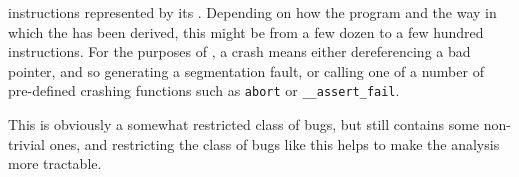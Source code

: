 \begin{itemize}
  instructions represented by its \StateMachine.  Depending on how the
  program and the way in which the \StateMachine has been derived,
  this might be from a few dozen to a few hundred instructions.  For
  the purposes of \implementation, a crash means either dereferencing
  a bad pointer, and so generating a segmentation fault, or calling
  one of a number of pre-defined crashing functions such as
  \verb|abort| or \verb|__assert_fail|.
\end{itemize}

This is obviously a somewhat restricted class of bugs, but still
contains some non-trivial ones, and restricting the class of bugs like
this helps to make the analysis more tractable.


